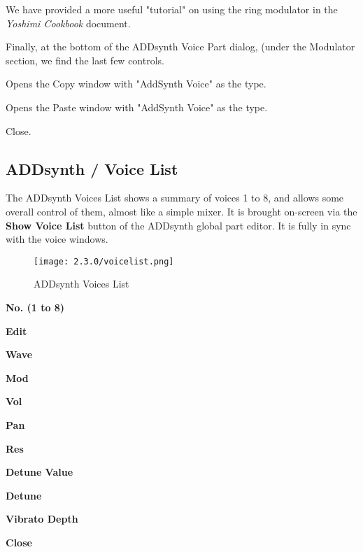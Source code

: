    We have provided a more useful "tutorial" on using the ring modulator in the
   \textsl{Yoshimi Cookbook} \cite{cookbook} document.

   Finally, at the bottom of the ADDsynth Voice Part dialog, (under the Modulator
   section, we find the last few controls.

   \setcounter{ItemCounter}{0}      %

   Opens the Copy window with "AddSynth Voice" as the type.

   Opens the Paste window with "AddSynth Voice" as the type.

   Close.


\subsection{ADDsynth / Voice List}
\label{subsec:addsynth_voice_list}

   The ADDsynth Voices List shows a summary of voices 1 to 8, and allows
   some overall control of them, almost like a simple mixer.
   It is brought on-screen via the \textbf{Show Voice List} button
   of the ADDsynth global part editor.
   It is fully in sync with the voice windows.

\begin{figure}[H]
   \centering
   \texttt{[image: 2.3.0/voicelist.png]}
   \caption{ADDsynth Voices List}
   \label{fig:addsynth_voices_list}
\end{figure}

   \begin{enumber}
      \item \textbf{No. (1 to 8)}
      \item \textbf{Edit}
      \item \textbf{Wave}
      \item \textbf{Mod}
      \item \textbf{Vol}
      \item \textbf{Pan}
      \item \textbf{Res}
      \item \textbf{Detune Value}
      \item \textbf{Detune}
      \item \textbf{Vibrato Depth}
      \item \textbf{Close}
   \end{enumber}

